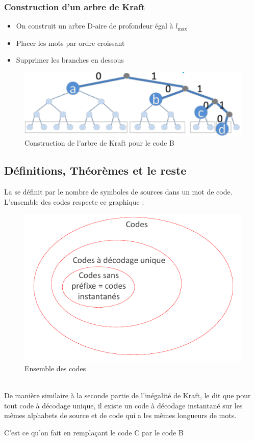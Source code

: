 \documentclass[11pt,a4paper]{article}
\begin{document}
\subsubsection{Construction d'un arbre de Kraft}
\begin{itemize}
	\item On construit un arbre D-aire de profondeur égal à $l_{\max}$
	\item Placer les mots par ordre croissant
	\item Supprimer les branches en dessous
\end{itemize}
\begin{figure}[!h]
	\centering	
	\includegraphics[scale=0.3]{images/arbre_Kraft}
	\caption{Construction de l'arbre de Kraft pour le code B}
	\label{Arbre Kraft}
\end{figure}

\subsection{Définitions, Théorèmes et le reste}

La  se définit par le nombre de symboles de sources dans un mot de code.\\
L'ensemble des codes respecte ce graphique :
\begin{figure}[!h]
	\centering
	\caption{Ensemble des codes}
	\includegraphics[scale=0.5]{images/tout_code}
\end{figure}\\
De manière similaire à la seconde partie de l'inégalité de Kraft, le  dit que pour tout code à décodage unique, il existe un code à décodage instantané sur les mêmes alphabets de source et de code qui a les mêmes longueurs de mots.
\begin{exemple}[0.7]
	C'est ce qu'on fait en remplaçant le code C par le code B
\end{exemple}
\end{document}
